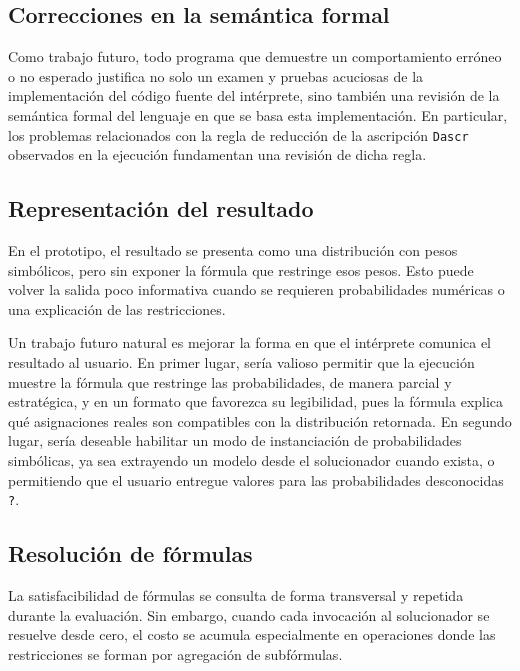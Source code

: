\subsection{Correcciones en la semántica formal}

 Como trabajo futuro, todo programa que demuestre un comportamiento
erróneo o no esperado justifica no solo un examen y pruebas acuciosas
de la implementación del código fuente del intérprete, sino también
una revisión de la semántica formal del lenguaje en que se basa
esta implementación. En particular, los
problemas relacionados con la regla de reducción de la ascripción
\lstinline|Dascr| observados en la ejecución fundamentan una revisión
de dicha regla.

\subsection{Representación del resultado} En el prototipo, el resultado se presenta como una distribución con pesos simbólicos, pero sin exponer la fórmula que restringe esos pesos. Esto puede volver la salida poco informativa cuando se requieren probabilidades numéricas o una explicación de las restricciones.

Un trabajo futuro natural es mejorar la forma en que el intérprete
comunica el resultado al usuario. En primer lugar, sería valioso
permitir que la ejecución muestre la fórmula que restringe las
probabilidades, de manera parcial y estratégica, y en un formato que
favorezca su legibilidad, pues la fórmula explica qué asignaciones
reales son compatibles con la distribución retornada.  En segundo
lugar, sería deseable habilitar un modo de instanciación de
probabilidades simbólicas, ya sea extrayendo un modelo desde el solucionador
cuando exista, o permitiendo que el usuario entregue valores para las
probabilidades desconocidas \lstinline|?|.



\subsection{Resolución de fórmulas} La satisfacibilidad de fórmulas se consulta de forma transversal y repetida durante la evaluación. Sin embargo, cuando cada invocación al solucionador se resuelve desde cero, el costo se acumula especialmente en operaciones donde las restricciones se forman por agregación de subfórmulas.

